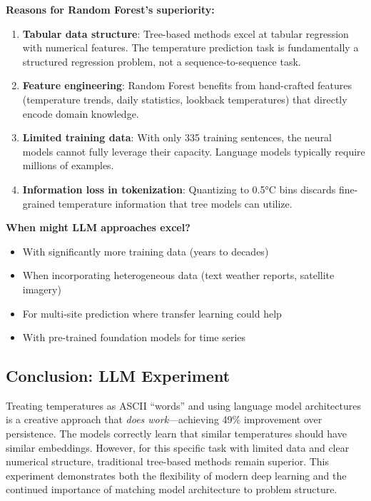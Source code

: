 \documentclass[11pt,letterpaper]{article}
\begin{document}
\textbf{Reasons for Random Forest's superiority:}
\begin{enumerate}[noitemsep]
    \item \textbf{Tabular data structure}: Tree-based methods excel at tabular regression with numerical features. The temperature prediction task is fundamentally a structured regression problem, not a sequence-to-sequence task.

    \item \textbf{Feature engineering}: Random Forest benefits from hand-crafted features (temperature trends, daily statistics, lookback temperatures) that directly encode domain knowledge.

    \item \textbf{Limited training data}: With only 335 training sentences, the neural models cannot fully leverage their capacity. Language models typically require millions of examples.

    \item \textbf{Information loss in tokenization}: Quantizing to 0.5°C bins discards fine-grained temperature information that tree models can utilize.
\end{enumerate}

\textbf{When might LLM approaches excel?}
\begin{itemize}[noitemsep]
    \item With significantly more training data (years to decades)
    \item When incorporating heterogeneous data (text weather reports, satellite imagery)
    \item For multi-site prediction where transfer learning could help
    \item With pre-trained foundation models for time series
\end{itemize}

\subsection{Conclusion: LLM Experiment}

Treating temperatures as ASCII ``words'' and using language model architectures is a creative approach that \textit{does work}---achieving 49\% improvement over persistence. The models correctly learn that similar temperatures should have similar embeddings. However, for this specific task with limited data and clear numerical structure, traditional tree-based methods remain superior. This experiment demonstrates both the flexibility of modern deep learning and the continued importance of matching model architecture to problem structure.
\end{document}
